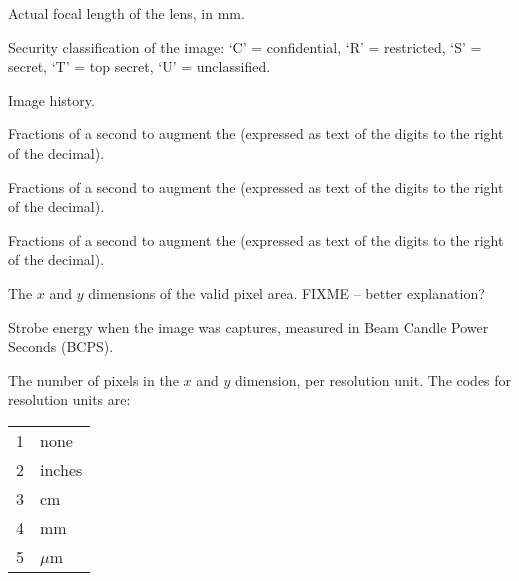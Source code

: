 Actual focal length of the lens, in mm.
\apiend

Security classification of the image: `C' = confidential,
`R' = restricted, `S' = secret, `T' = top secret,
`U' = unclassified.
\apiend

Image history.
\apiend



Fractions of a second to augment the  (expressed
as text of the digits to the right of the decimal).
\apiend

Fractions of a second to augment the  (expressed
as text of the digits to the right of the decimal).
\apiend

Fractions of a second to augment the  (expressed
as text of the digits to the right of the decimal).
\apiend


The $x$ and $y$ dimensions of the valid pixel area.
FIXME -- better explanation?
\apiend


Strobe energy when the image was captures, measured in Beam Candle Power
Seconds (BCPS).
\apiend


The number of pixels in the $x$ and $y$ dimension, per resolution unit.
The codes for resolution units are:
\smallskip

\begin{tabular}{p{0.3in} p{4in}}
1 & none \\
2 & inches \\
3 & cm \\
4 & mm \\
5 & $\mu$m \\
\end{tabular}
\apiend


